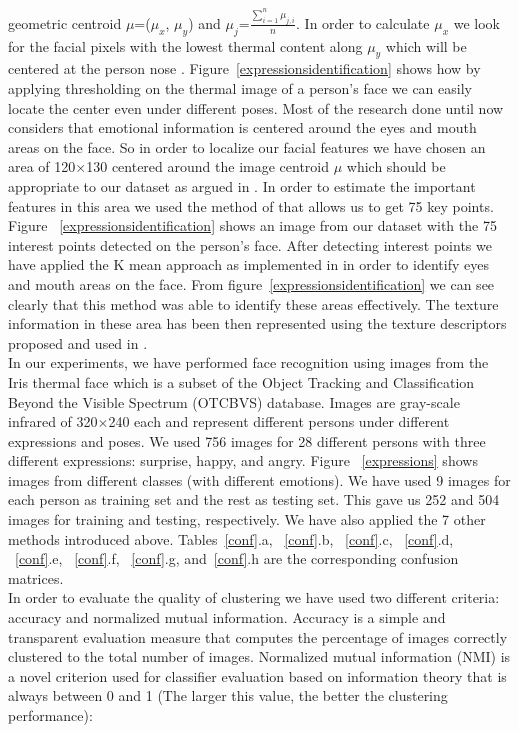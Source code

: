 \documentclass[journal,10pt]{elsart}
\begin{document}
geometric centroid $\mu$=($\mu_x$, $\mu_y$) and $\mu_j$=$\frac {\sum_{i=1}^n \mu_{j,i}}{n}$. In order to calculate $\mu_x$ we look for the facial pixels with the lowest thermal content along $\mu_y$ which will be centered at the person nose \cite{Prokoski2000}. Figure~\ref{expressionsidentification} shows how by applying thresholding on the thermal image of a person's face we can easily locate the center even under different poses. Most of the research done until now considers that emotional information is centered around the eyes and mouth areas on the face. So in order to localize our facial features we have chosen an area of 120$\times$130 centered around the image centroid $\mu$ which should be appropriate to our dataset as argued in \cite{Trujillo2005}. In order to estimate the important features in this area we used the method of \cite{Olague2009} that allows us to get 75 key points. Figure ~\ref{expressionsidentification} shows an image from our dataset with the 75 interest points detected on the person's face. After detecting interest points we have applied the K mean approach as implemented in \cite{Trujillo2005} in order to identify eyes and mouth areas on the face. From figure~\ref{expressionsidentification} we can see clearly that this method was able to identify these areas effectively. The texture information in these area has been then represented using the texture descriptors proposed and used in \cite{DBLP:journals/cviu/HernandezOHTR07}.
\\ In our experiments, we have performed face recognition using images from the Iris thermal face which is a subset of the Object Tracking and Classification Beyond the Visible Spectrum (OTCBVS) database. Images are gray-scale infrared of 320$\times$240 each and represent different persons under different expressions and poses. We used 756 images for 28 different persons with three different expressions: surprise, happy, and angry. Figure ~\ref{expressions} shows images from different classes (with different emotions). We have used 9 images for each person as training set and the rest as testing set. This gave us 252 and 504 images for training and testing, respectively. We have also applied the 7 other methods introduced above. Tables~\ref{conf}.a, ~\ref{conf}.b, ~\ref{conf}.c, ~\ref{conf}.d, ~\ref{conf}.e, ~\ref{conf}.f, ~\ref{conf}.g, and~\ref{conf}.h are the corresponding confusion matrices.
\\In order to evaluate the quality of clustering we have used two different criteria: accuracy and normalized mutual information. Accuracy is a simple and transparent evaluation measure that computes the percentage of images correctly clustered to the total number of images. Normalized mutual information (NMI) \cite{Strehl2002} is a novel criterion used for classifier evaluation based on information theory that is always between 0 and 1 (The larger this value, the better the clustering performance):
\end{document}
